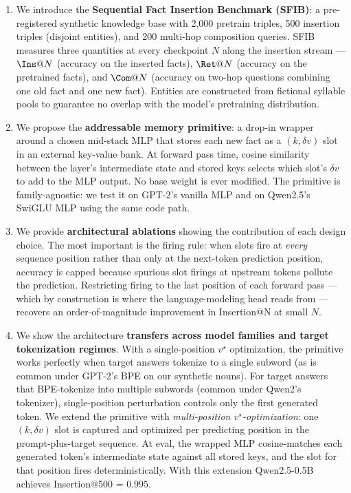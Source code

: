 \documentclass[11pt,a4paper]{article}
\begin{document}
\begin{enumerate}[leftmargin=*,topsep=2pt,itemsep=2pt]
\item We introduce the \textbf{Sequential Fact Insertion Benchmark
(SFIB)}: a pre-registered synthetic knowledge base with 2{,}000 pretrain
triples, 500 insertion triples (disjoint entities), and 200 multi-hop
composition queries. SFIB measures three quantities at every checkpoint
$N$ along the insertion stream --- $\Ins@N$ (accuracy on the inserted
facts), $\Ret@N$ (accuracy on the pretrained facts), and $\Com@N$
(accuracy on two-hop questions combining one old fact and one new fact).
Entities are constructed from fictional syllable pools to guarantee no
overlap with the model's pretraining distribution.

\item We propose the \textbf{addressable memory primitive}: a drop-in
wrapper around a chosen mid-stack MLP that stores each new fact as a
$(k, \delta v)$ slot in an external key-value bank. At forward pass time,
cosine similarity between the layer's intermediate state and stored keys
selects which slot's $\delta v$ to add to the MLP output. No base weight
is ever modified. The primitive is family-agnostic: we test it on GPT-2's
vanilla MLP and on Qwen2.5's SwiGLU MLP using the same code path.

\item We provide \textbf{architectural ablations} showing the contribution
of each design choice. The most important is the firing rule: when slots
fire at \emph{every} sequence position rather than only at the next-token
prediction position, accuracy is capped because spurious slot firings at
upstream tokens pollute the prediction. Restricting firing to the last
position of each forward pass --- which by construction is where the
language-modeling head reads from --- recovers an order-of-magnitude
improvement in Insertion@N at small $N$.

\item We show the architecture \textbf{transfers across model families
and target tokenization regimes}. With a single-position $v^\star$
optimization, the primitive works perfectly when target answers tokenize
to a single subword (as is common under GPT-2's BPE on our synthetic
nouns). For target answers that BPE-tokenize into multiple subwords
(common under Qwen2's tokenizer), single-position perturbation controls
only the first generated token. We extend the primitive with
\emph{multi-position $v^\star$-optimization}: one $(k, \delta v)$ slot is
captured and optimized per predicting position in the prompt-plus-target
sequence. At eval, the wrapped MLP cosine-matches each generated token's
intermediate state against all stored keys, and the slot for that position
fires deterministically. With this extension Qwen2.5-0.5B achieves
Insertion@500 = $0.995$.
\end{enumerate}
\end{document}
